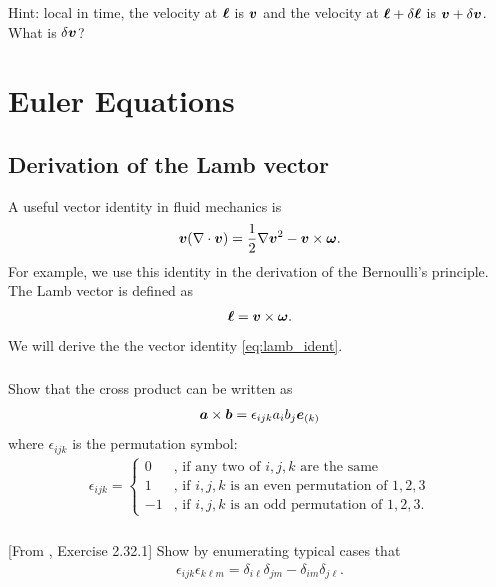 \documentclass[11pt,letterpaper]{report}
\begin{document}
Hint: local in time, the velocity at $\boldsymbol{\ell}$ is $\boldsymbol{v}$ and the velocity at $\boldsymbol{\ell}+\delta\boldsymbol{\ell}$ is $\boldsymbol{v}+\delta\boldsymbol{v}$. What is $\delta\boldsymbol{v}$?

\chapter{Euler Equations}
\section{Derivation of the Lamb vector}
A useful vector identity in fluid mechanics is
\begin{align}
    \boldsymbol{v}(\nabla\cdot\boldsymbol{v}) = \frac{1}{2}\nabla\boldsymbol{v}^2-\boldsymbol{v}\times\boldsymbol{\omega}.\label{eq:lamb_ident}
\end{align}
For example, we use this identity in the derivation of the Bernoulli's principle. The Lamb vector is defined as
\begin{align}
    \boldsymbol{\ell} = \boldsymbol{v}\times\boldsymbol{\omega}.
\end{align}
We will derive the the vector identity \eqref{eq:lamb_ident}.

\subsection{}
Show that the cross product can be written as
\begin{align}
    \boldsymbol{a}\times \boldsymbol{b} = \epsilon_{ijk}a_ib_j\boldsymbol{e}_{(k)}
\end{align}
where $\epsilon_{ijk}$ is the permutation symbol:
\begin{align}
    \epsilon_{ijk} = \begin{cases}
        0 &\text{, if any two of $i,j,k$ are the same}\\
        1 &\text{, if $i,j,k$ is an even permutation of $1,2,3$}\\
        -1 &\text{, if $i,j,k$ is an odd permutation of $1,2,3$}.
    \end{cases}
\end{align}

\subsection{}
[From \cite{Aris_62}, Exercise 2.32.1] Show by enumerating typical cases that
\begin{align}
    \epsilon_{ijk}\epsilon_{k\ell m} = \delta_{i\ell}\delta_{jm}-\delta_{im}\delta_{j\ell}.\label{eq:perm_prod_ident}
\end{align}
\end{document}
